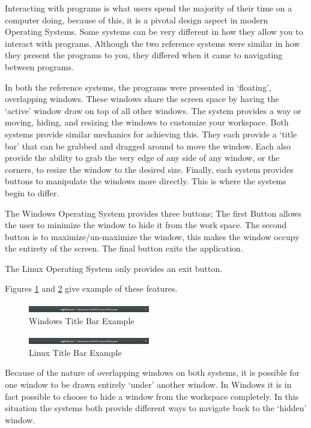\documentclass[a4paper]{report}
\begin{document}
Interacting with programs is what users spend the majority of their time on a computer doing, because of this, it is a pivotal design aspect in modern Operating Systems. Some systems can be very different in how they allow you to interact with programs. Although the two reference systems were similar in how they present the programs to you, they differed when it came to navigating between programs.

In both the reference systems, the programs were presented in `floating', overlapping windows. These windows share the screen space by having the `active' window draw on top of all other windows. The system provides a way or moving, hiding, and resizing the windows to customize your workspace. Both systems provide similar mechanics for achieving this. They each provide a `title bar' that can be grabbed and dragged around to move the window. Each also provide the ability to grab the very edge of any side of any window, or the corners, to resize the window to the desired size. Finally, each system provides buttons to manipulate the windows more directly. This is where the systems begin to differ.

The Windows Operating System provides three buttons; The first Button allows the user to minimize the window to hide it from the work space. The second button is to maximize/un-maximize the window, this makes the window occupy the entirety of the screen. The final button exits the application.

The Linux Operating System only provides an exit button.

Figures \ref{fig:WinTitleBarScreen} and \ref{fig:LinTitleBarScreen} give example of these features.

\begin{figure}[ht]
\centering
\includegraphics[width=200px]{images/Linux_title_bar_screenshot}
\caption{Windows Title Bar Example}
\label{fig:WinTitleBarScreen}
\end{figure}

\begin{figure}[ht]
\centering
\includegraphics[width=200px]{images/Linux_title_bar_screenshot}
\caption{Linux Title Bar Example}
\label{fig:LinTitleBarScreen}
\end{figure}

Because of the nature of overlapping windows on both systems, it is possible for one window to be drawn entirely `under' another window. In Windows it is in fact possible to choose to hide a window from the workspace completely. In this situation the systems both provide different ways to navigate back to the `hidden' window.
\end{document}
